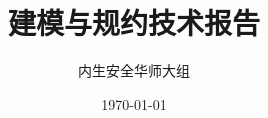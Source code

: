 \documentclass[UTF8,a4paper,12pt,oneside]{book}
\begin{document}
\title{\heiti 建模与规约技术报告}
\author{\kaishu 内生安全华师大组}
\date{\today}

\frontmatter
\maketitle
\tableofcontents

\mainmatter




\backmatter
\end{document}
